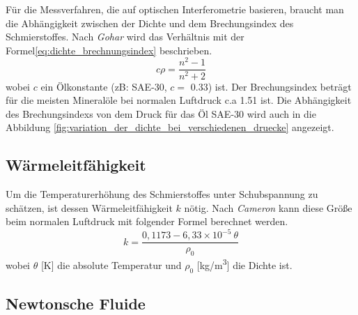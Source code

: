 Für die Messverfahren, die auf optischen Interferometrie basieren, braucht man die Abhängigkeit zwischen der Dichte und dem Brechungsindex des Schmierstoffes.
Nach \textit{Gohar} \cite{gohar_1966} wird das Verhältnis mit der Formel\ref{eq:dichte_brechnungsindex} beschrieben.
\begin{equation}
    \label{eq:dichte_brechnungsindex}
    c\rho = \frac{n^2 - 1}{n^2 + 2}
\end{equation}
%
wobei $c$ ein Ölkonstante (zB: SAE-30, $c = $ \num{0.33}) ist.
Der Brechungsindex beträgt für die meisten Mineralöle bei normalen Luftdruck c.a \num{1.51} ist.
Die Abhängigkeit des Brechungsindexs von dem Druck für das Öl SAE-30 wird auch in die Abbildung \ref{fig:variation_der_dichte_bei_verschiedenen_druecke} angezeigt.

\subsection*{Wärmeleitfähigkeit}
\label{waermeleitfaehigkeit}

Um die Temperaturerhöhung des Schmierstoffes unter Schubspannung zu schätzen, ist dessen Wärmeleitfähigkeit $k$ nötig.
Nach \textit{Cameron} \cite{cameron_1966} kann diese Größe beim normalen Luftdruck mit folgender Formel berechnet werden.
\begin{equation}
    \label{eq:waermeleitfaehigkeit}
    k = \frac{0,1173 - 6,33 \times 10^{-5} \ \theta}{\rho_0}
\end{equation}
%
wobei $\theta$ [\si{\kelvin}] die absolute Temperatur und $\rho_0$ [\si{kg/m^3}] die Dichte ist.

\subsection*{Newtonsche Fluide}
\label{sub:newtonsche_fluide}

